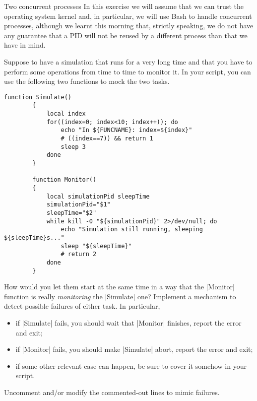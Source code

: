 
\begin{exercise}[Inspirational]{Two concurrent processes}
    In this exercise we will assume that we can trust the operating system kernel and, in particular, we will use Bash to handle concurrent processes, although we learnt this morning that, strictly speaking, we do not have any guarantee that a PID will not be reused by a different process than that we have in mind.

    Suppose to have a simulation that runs for a very long time and that you have to perform some operations from time to time to monitor it.
    In your script, you can use the following two functions to mock the two tasks.
    \begin{lstlisting}[style=myBash, numbers=none]
        function Simulate()
        {
            local index
            for((index=0; index<10; index++)); do
                echo "In ${FUNCNAME}: index=${index}"
                # ((index==7)) && return 1
                sleep 3
            done
        }

        function Monitor()
        {
            local simulationPid sleepTime
            simulationPid="$1"
            sleepTime="$2"
            while kill -0 "${simulationPid}" 2>/dev/null; do
                echo "Simulation still running, sleeping ${sleepTime}s..."
                sleep "${sleepTime}"
                # return 2
            done
        }
    \end{lstlisting}
    How would you let them start at the same time in a way that the \bash|Monitor| function is really \emph{monitoring} the \bash|Simulate| one?
    Implement a mechanism to detect possible failures of either task.
    In particular,
    \begin{itemize}
        \item if \bash|Simulate| fails, you should wait that \bash|Monitor| finishes, report the error and exit;
        \item if \bash|Monitor| fails, you should make \bash|Simulate| abort, report the error and exit;
        \item if some other relevant case can happen, be sure to cover it somehow in your script.
    \end{itemize}
    Uncomment and/or modify the commented-out lines to mimic failures.
\end{exercise}